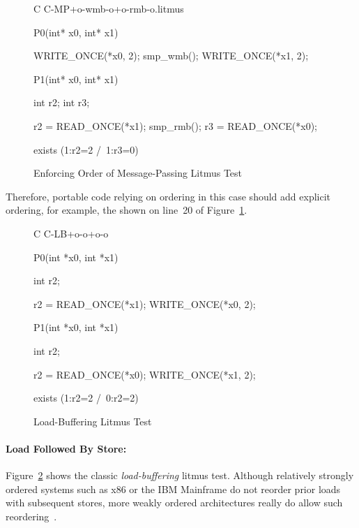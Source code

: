 \begin{figure}[tbp]
{ \scriptsize
\begin{verbbox}[\LstLineNo]
C C-MP+o-wmb-o+o-rmb-o.litmus

{
}

P0(int* x0, int* x1) {

  WRITE_ONCE(*x0, 2);
  smp_wmb();
  WRITE_ONCE(*x1, 2);

}

P1(int* x0, int* x1) {

  int r2;
  int r3;

  r2 = READ_ONCE(*x1);
  smp_rmb();
  r3 = READ_ONCE(*x0);

}

exists (1:r2=2 /\ 1:r3=0)
\end{verbbox}
}
\centering
\theverbbox
\caption{Enforcing Order of Message-Passing Litmus Test}
\label{fig:advsync:Enforcing Order of Message-Passing Litmus Test}
\end{figure}

Therefore, portable code relying on ordering in this case should
add explicit ordering, for example, the  shown on
line~20 of
Figure~\ref{fig:advsync:Enforcing Order of Message-Passing Litmus Test}.

\begin{figure}[tbp]
{ \scriptsize
\begin{verbbox}[\LstLineNo]
C C-LB+o-o+o-o
{
}

P0(int *x0, int *x1)
{
  int r2;

  r2 = READ_ONCE(*x1);
  WRITE_ONCE(*x0, 2);
}


P1(int *x0, int *x1)
{
  int r2;

  r2 = READ_ONCE(*x0);
  WRITE_ONCE(*x1, 2);
}

exists (1:r2=2 /\ 0:r2=2)
\end{verbbox}
}
\centering
\theverbbox
\caption{Load-Buffering Litmus Test}
\label{fig:advsync:Load-Buffering Litmus Test}
\end{figure}

\paragraph{Load Followed By Store:}
Figure~\ref{fig:advsync:Load-Buffering Litmus Test}
shows the classic \emph{load-buffering} litmus test.
Although relatively strongly ordered systems such as x86
or the IBM Mainframe do not reorder prior loads with subsequent stores,
more weakly ordered architectures really do allow such
reordering~\cite{JadeAlglave2011ppcmem}.


